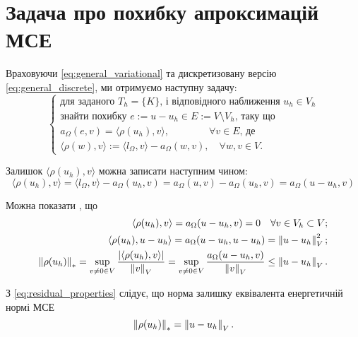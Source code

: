 
\section{Задача про похибку апроксимацій МСЕ}

Враховуючи
\eqref{eq:general_variational} та дискретизовану версію
\eqref{eq:general_discrete}, ми отримуємо наступну задачу:
%
\begin{equation}\label{eq:AE_problem}
	\begin{cases}
		\mbox{для заданого } T_h=\{K\} \text{, і відповідного наближення } u_h \in V_h \\
		\text{знайти похибку } e:=u-u_h \in E := V \setminus V_h \text{, таку що} \\
		a_\Omega(e,v) = \langle\rho(u_h), v\rangle, \qquad \qquad \forall v \in E \text{, де}\\
		\langle\rho(w), v\rangle := \langle l_\Omega, v\rangle - a_\Omega(w, v), \quad \forall w,v \in V.
	\end{cases}
\end{equation}

Залишок $\langle\rho(u_h), v\rangle$ можна записати наступним чином:
\begin{equation*}
	\langle\rho(u_h), v\rangle
		= \langle l_\Omega, v\rangle - a_\Omega(u_h, v)
		= a_\Omega(u,v)-a_\Omega(u_h, v) = a_\Omega(u-u_h, v)
\end{equation*}

Можна показати \cite{kvasnyca2002}, що
%
\begin{equation}\label{eq:residual_properties}
	\begin{split}
		\langle\rho(u_h), v\rangle = a_\Omega(u-u_h, v) = 0 \quad \forall v \in V_h \subset V ;\\
		\langle\rho(u_h), u-u_h\rangle = a_\Omega(u-u_h, u-u_h) = \left\lVert u-u_h\right\rVert^2_V ;\\
		\left\lVert\rho(u_h)\right\rVert_* = \sup \limits_{v \ne 0 \in V} \frac{|\langle\rho(u_h), v\rangle|}{\left\lVert v\right\rVert_V} =
			\sup \limits_{v \ne 0 \in V} \frac{a_\Omega(u-u_h, v)}{\left\lVert v\right\rVert_V} \le \left\lVert u-u_h\right\rVert_V .
	\end{split}
\end{equation}

З
\eqref{eq:residual_properties} слідує, що норма залишку еквівалента енергетичній нормі МСЕ
\begin{equation}
	\left\lVert\rho(u_h)\right\rVert_* = \left\lVert u-u_h\right\rVert_V.
\end{equation}


